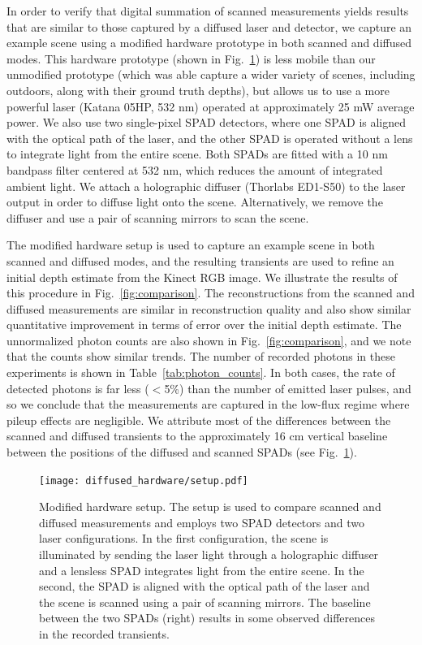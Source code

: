 \documentclass[runningheads]{llncs}
\begin{document}
In order to verify that digital summation of scanned measurements yields results
that are similar to those captured by a diffused laser and detector, we capture
an example scene using a modified hardware prototype in both scanned and
diffused modes. This hardware prototype (shown in Fig.~\ref{fig:hardware}) is less mobile than 
our unmodified prototype (which was able capture a wider variety of scenes,
including outdoors, along with their ground truth
depths), but allows us to use a more powerful laser (Katana 05HP, 532 nm)
operated at approximately 25 mW average power. We also use two single-pixel SPAD
detectors, where one SPAD is aligned with the optical path of the laser, and the
other SPAD is operated without a lens to integrate light from the entire scene.
Both SPADs are fitted with a 10 nm bandpass filter centered at 532 nm, which
reduces the amount of integrated ambient light. We attach a holographic diffuser
(Thorlabs ED1-S50) to the laser output in order to diffuse light onto the scene.
Alternatively, we remove the diffuser and use a pair of scanning mirrors to scan
the scene.

The modified hardware setup is used to capture an example scene in both scanned and
diffused modes, and the resulting transients are used to refine an initial depth
estimate from the Kinect RGB image. We illustrate the results of this procedure
in Fig.~\ref{fig:comparison}. The reconstructions from the scanned and diffused
measurements are similar in reconstruction quality and also show similar
quantitative improvement in terms of error over the initial depth estimate. The
unnormalized photon counts are also shown in Fig.~\ref{fig:comparison}, and we
note that the counts show similar trends. The number of recorded photons in
these experiments is shown in Table~\ref{tab:photon_counts}. In both cases, the
rate of detected photons is far less ($<$5\%) than the number of emitted laser
pulses, and so we conclude that the measurements are captured in the low-flux
regime where pileup effects are negligible. We attribute most of the differences
between the scanned and diffused transients to the approximately 16 cm vertical
baseline between the positions of the diffused and scanned SPADs (see
Fig.~\ref{fig:hardware}).
\begin{figure}[ht!]
  \centering \texttt{[image: diffused\_hardware/setup.pdf]}
  \caption{Modified hardware setup. The setup is used to compare scanned and
  diffused measurements and employs two SPAD detectors and two laser
  configurations. In the first configuration, the scene is illuminated by
  sending the laser light through a holographic diffuser and a lensless SPAD 
  integrates light from the entire scene. In the second, the SPAD is aligned
  with the optical path of the laser and the scene is scanned using a pair of
  scanning mirrors. The baseline between the two SPADs (right) results in some
  observed differences in the recorded transients.}
  \label{fig:hardware}
\end{figure}
\end{document}
